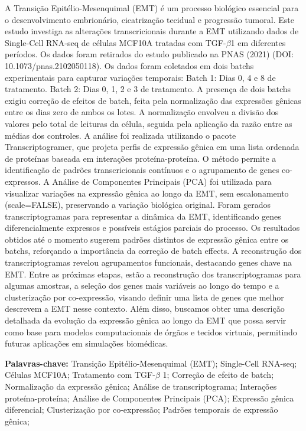 \documentclass[12pt]{article}
\begin{document}
A Transição Epitélio-Mesenquimal (EMT) é um processo biológico essencial para o desenvolvimento embrionário, cicatrização tecidual e progressão tumoral. Este estudo investiga as alterações transcricionais durante a EMT utilizando dados de Single-Cell RNA-seq de células MCF10A tratadas com TGF-$\beta$1 em diferentes períodos. Os dados foram retirados do estudo publicado na PNAS (2021) (DOI: 10.1073/pnas.2102050118).
Os dados foram coletados em dois batchs experimentais para capturar variações temporais: Batch 1: Dias 0, 4 e 8 de tratamento. Batch 2: Dias 0, 1, 2 e 3 de tratamento. A presença de dois batchs exigiu correção de efeitos de batch, feita pela normalização das expressões gênicas entre os dias zero de ambos os lotes. A normalização envolveu a divisão dos valores pelo total de leituras da célula, seguida pela aplicação da razão entre as médias dos controles.
A análise foi realizada utilizando o pacote Transcriptogramer, que projeta perfis de expressão gênica em uma lista ordenada de proteínas baseada em interações proteína-proteína. O método permite a identificação de padrões transcricionais contínuos e o agrupamento de genes co-expressos. A Análise de Componentes Principais (PCA) foi utilizada para visualizar variações na expressão gênica ao longo da EMT, sem escalonamento (scale=FALSE), preservando a variação biológica original.
Foram gerados transcriptogramas para representar a dinâmica da EMT, identificando genes diferencialmente expressos e possíveis estágios parciais do processo. Os resultados obtidos até o momento sugerem padrões distintos de expressão gênica entre os batchs, reforçando a importância da correção de batch effects. A reconstrução dos transcriptogramas revelou agrupamentos funcionais, destacando genes chave na EMT.
Entre as próximas etapas, estão a reconstrução dos transcriptogramas para algumas amostras, a seleção dos genes mais variáveis ao longo do tempo e a clusterização por co-expressão, visando definir uma lista de genes que melhor descrevem a EMT nesse contexto. Além disso, buscamos obter uma descrição detalhada da evolução da expressão gênica ao longo da EMT que possa servir como base para modelos computacionais de órgãos e tecidos virtuais, permitindo futuras aplicações em simulações biomédicas.


\textbf{Palavras-chave:} Transição Epitélio-Mesenquimal (EMT); Single-Cell RNA-seq;
Células MCF10A;
Tratamento com TGF-$\beta$ 1;
Correção de efeito de batch;
Normalização da expressão gênica;
Análise de transcriptograma;
Interações proteína-proteína;
Análise de Componentes Principais (PCA);
Expressão gênica diferencial;
Clusterização por co-expressão;
Padrões temporais de expressão gênica;
\end{document}
